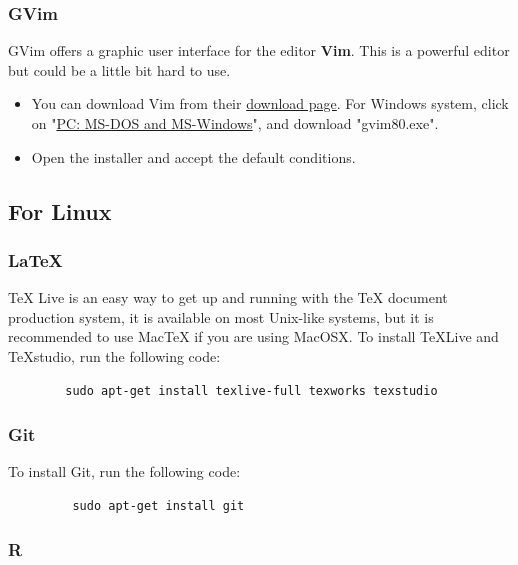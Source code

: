 \documentclass[11pt]{article} %
\begin{document}
    \subsubsection{GVim}
    GVim offers a graphic user interface for the editor \textbf{Vim}. 
    This is a powerful editor but could be a little bit hard to use. 
    \begin{itemize}
    	\item You can download Vim from their \href{https://vim.sourceforge.io/download.php}{download page}. 
      For Windows system, click on "\href{https://vim.sourceforge.io/download.php#pc}{PC: MS-DOS and MS-Windows}", and download "gvim80.exe". 
    	\item Open the installer and accept the default conditions. 
    \end{itemize}
    
  \subsection{For Linux}
  
    \subsubsection{LaTeX}
    TeX Live is an easy way to get up and running with the TeX document production system, it is available on most Unix-like systems, but it is recommended to use MacTeX if you are using MacOSX. 
    To install TeXLive and TeXstudio, run the following code:
    	\begin{lstlisting}
    	sudo apt-get install texlive-full texworks texstudio
    	\end{lstlisting}
      
  \subsubsection{Git}
    To install Git, run the following code:
    	\begin{lstlisting}
    	 sudo apt-get install git
    	\end{lstlisting}
      
  \subsubsection{R}
  
\end{document}
